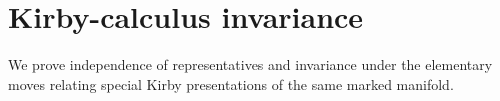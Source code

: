 \section{Kirby-calculus invariance}
\label{sec:kirby-invariance}

We prove independence of representatives and invariance under the elementary
moves relating special Kirby presentations of the same marked manifold.


